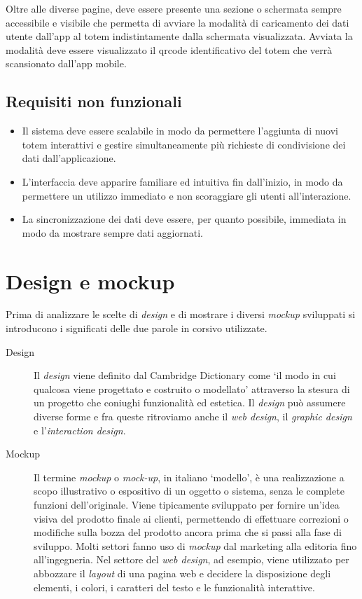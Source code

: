 Oltre alle diverse pagine, deve essere presente una sezione o schermata sempre accessibile e visibile che permetta di avviare la modalità di caricamento dei dati utente dall'app al totem indistintamente dalla schermata visualizzata. Avviata la modalità deve essere visualizzato il qrcode identificativo del totem che verrà scansionato dall'app mobile.
%
\subsection{Requisiti non funzionali}
\begin{itemize}
    \item Il sistema deve essere scalabile in modo da permettere l'aggiunta di nuovi totem interattivi e gestire simultaneamente più richieste di condivisione dei dati dall'applicazione.
    \item L'interfaccia deve apparire familiare ed intuitiva fin dall'inizio, in modo da permettere un utilizzo immediato e non scoraggiare gli utenti all'interazione.
    \item La sincronizzazione dei dati deve essere, per quanto possibile, immediata in modo da mostrare sempre dati aggiornati.
\end{itemize}
%
%
%
\section{Design e mockup}
Prima di analizzare le scelte di \textit{design} e di mostrare i diversi \textit{mockup} sviluppati si introducono i significati delle due parole in corsivo utilizzate.

\begin{description}
    \item[Design] Il \textit{design} viene definito dal Cambridge Dictionary \cite{cambridgeDict} come \enquote*{il modo in cui qualcosa viene progettato e costruito o modellato} attraverso la stesura di un progetto che coniughi funzionalità ed estetica. Il \textit{design} può assumere diverse forme e fra queste ritroviamo anche il \textit{web design}, il \textit{graphic design} e l'\textit{interaction design}.
    \item[Mockup] Il termine \textit{mockup} o \textit{mock-up}, in italiano \enquote*{modello}, è una realizzazione a scopo illustrativo o espositivo di un oggetto o sistema, senza le complete funzioni dell'originale. Viene tipicamente sviluppato per fornire un'idea visiva del prodotto finale ai clienti, permettendo di effettuare correzioni o modifiche sulla bozza del prodotto ancora prima che si passi alla fase di sviluppo. Molti settori fanno uso di \textit{mockup} dal marketing alla editoria fino all'ingegneria. Nel settore del \textit{web design}, ad esempio, viene utilizzato per abbozzare il \textit{layout} di una pagina web e decidere la disposizione degli elementi, i colori, i caratteri del testo e le funzionalità interattive.
\end{description}

